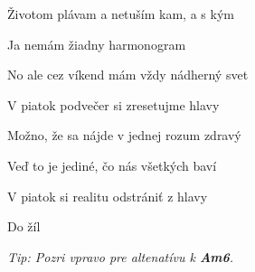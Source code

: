 \begin{song}
\bigskip

 Životom plávam a netuším kam, a s kým \par
{} Ja nemám žiadny harmonogram \par
No ale cez víkend mám  vždy nádherný svet \par

\bigskip

\Refren

\bigskip

V piatok podvečer si zresetujme hlavy \par
{}Možno, že sa nájde v jednej rozum zdravý  \par
{} Veď to je jediné, čo  nás všetkých baví \par
{} V piatok si realitu  odstrániť z hlavy \par
Do žíl \par

\begin{strumbox}
\large
{}
\end{strumbox}

\bigskip

\bigskip

{
\smaller\it
Tip: Pozri vpravo pre altenatívu k \textbf{Am6}.
}

\end{song}
